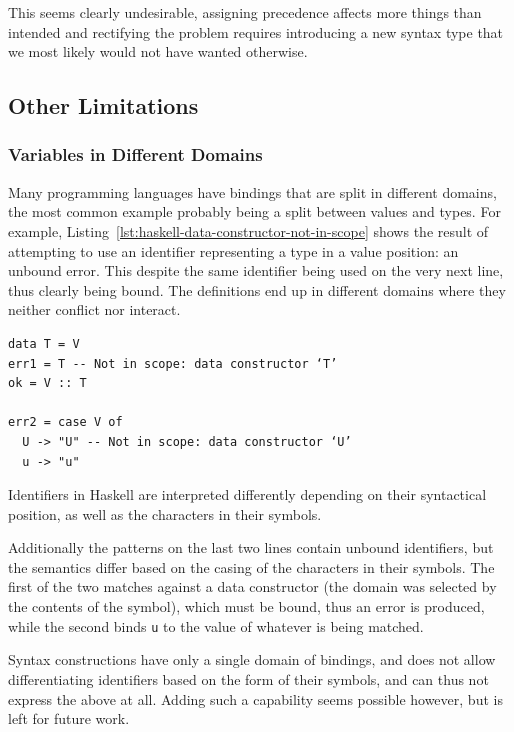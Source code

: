 \documentclass{kththesis}
\begin{document}
This seems clearly undesirable, assigning precedence affects more things than intended and rectifying the problem requires introducing a new syntax type that we most likely would not have wanted otherwise.

\subsection{Other Limitations} \label{sec:other-limitations}

\subsubsection{Variables in Different Domains}


Many programming languages have bindings that are split in different domains, the most common example probably being a split between values and types. For example, Listing~\ref{lst:haskell-data-constructor-not-in-scope} shows the result of attempting to use an identifier representing a type in a value position: an unbound error. This despite the same identifier being used on the very next line, thus clearly being bound. The definitions end up in different domains where they neither conflict nor interact.

\begin{listing}[t]
\begin{verbatim}
data T = V
err1 = T -- Not in scope: data constructor ‘T’
ok = V :: T

err2 = case V of
  U -> "U" -- Not in scope: data constructor ‘U’
  u -> "u"
\end{verbatim}
\caption{Identifiers in Haskell are interpreted differently depending on their syntactical position, as well as the characters in their symbols.}
\label{lst:haskell-data-constructor-not-in-scope}
\end{listing}

Additionally the patterns on the last two lines contain unbound identifiers, but the semantics differ based on the casing of the characters in their symbols. The first of the two matches against a data constructor (the domain was selected by the contents of the symbol), which must be bound, thus an error is produced, while the second binds \texttt{u} to the value of whatever is being matched.

Syntax constructions have only a single domain of bindings, and does not allow differentiating identifiers based on the form of their symbols, and can thus not express the above at all. Adding such a capability seems possible however, but is left for future work.
\end{document}
